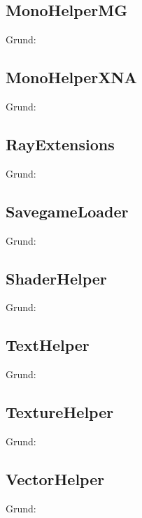 \subsection{MonoHelperMG}
Grund:
\subsection{MonoHelperXNA}
Grund:
\subsection{RayExtensions}
Grund:
\subsection{SavegameLoader}
Grund:
\subsection{ShaderHelper}
Grund:
\subsection{TextHelper}
Grund:
\subsection{TextureHelper}
Grund:
\subsection{VectorHelper}
Grund:



